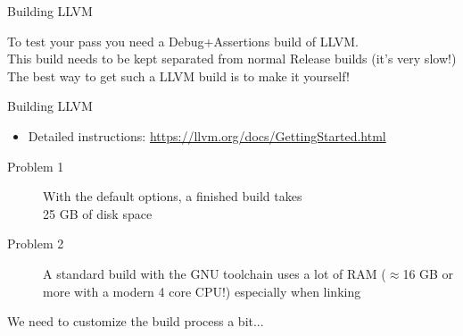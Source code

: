 \begin{frame}{Building LLVM}
\begin{center}
To test your pass you need a \alert{Debug+Assertions} build of LLVM.\\
\bigskip
This build needs to be \alert{kept separated} from normal Release builds (it's very slow!)\\
\bigskip
The best way to get such a LLVM build is to \alert{make it yourself}!
\end{center}
\end{frame}


\begin{frame}{Building LLVM}
\begin{itemize}
\item Detailed instructions: \url{https://llvm.org/docs/GettingStarted.html}
\end{itemize}
\bigskip
\begin{description}
\item[Problem 1] With the \alert{default options}, a finished build takes\\\alert{25 GB of disk space}
\item[Problem 2] A standard build with the GNU toolchain uses \alert{a lot of RAM} ($\approx$16 GB or more with a modern 4 core CPU!) especially when linking
\end{description}
\bigskip
We need to customize the build process a bit...
\end{frame}


